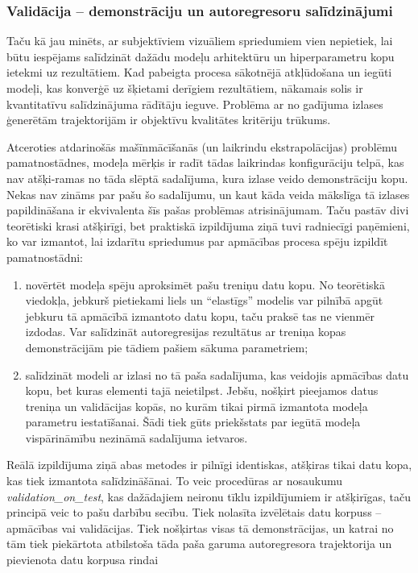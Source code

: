 \documentclass[12pt, a4paper]{article}
\numberwithin{equation}{section} %
\begin{document}
\subsubsection{Validācija -- demonstrāciju un autoregresoru salīdzinājumi}

Taču kā jau minēts, ar subjektīviem vizuāliem spriedumiem vien nepietiek, lai būtu iespējams salīdzināt dažādu modeļu arhitektūru un hiperparametru kopu ietekmi uz rezultātiem. Kad pabeigta procesa sākotnējā atkļūdošana un iegūti modeļi, kas konverģē uz šķietami derīgiem rezultātiem, nākamais solis ir kvantitatīvu salīdzinājuma rādītāju ieguve. Problēma ar no gadījuma izlases ģenerētām trajektorijām ir objektīvu kvalitātes kritēriju trūkums. 

Atceroties atdarinošās mašīnmācīšanās (un laikrindu ekstrapolācijas) problēmu pamatnostādnes, modeļa mērķis ir radīt tādas laikrindas konfigurāciju telpā, kas nav atšķi-ramas no tāda slēptā sadalījuma, kura izlase veido demonstrāciju kopu. Nekas nav zināms par pašu šo sadalījumu, un kaut kāda veida mākslīga tā izlases papildināšana ir ekvivalenta šīs pašas problēmas atrisinājumam. Taču pastāv divi teorētiski krasi atšķirīgi, bet praktiskā izpildījuma ziņā tuvi radniecīgi paņēmieni, ko var izmantot, lai izdarītu spriedumus par apmācības procesa spēju izpildīt pamatnostādni:

\begin{enumerate}
    \item novērtēt modeļa spēju aproksimēt pašu treniņu datu kopu. No teorētiskā viedokļa, jebkurš pietiekami liels un ``elastīgs'' modelis var pilnībā apgūt jebkuru tā apmācībā izmantoto datu kopu, taču praksē tas ne vienmēr izdodas. Var salīdzināt autoregresijas rezultātus ar treniņa kopas demonstrācijām pie tādiem pašiem sākuma parametriem;
    \item salīdzināt modeli ar izlasi no tā paša sadalījuma, kas veidojis apmācības datu kopu, bet kuras elementi tajā neietilpst. Jebšu, nošķirt pieejamos datus treniņa un validācijas kopās, no kurām tikai pirmā izmantota modeļa parametru iestatīšanai. Šādi tiek gūts priekšstats par iegūtā modeļa vispārināmību nezināmā sadalījuma ietvaros.
\end{enumerate}

Reālā izpildījuma ziņā abas metodes ir pilnīgi identiskas, atšķiras tikai datu kopa, kas tiek izmantota salīdzināšānai. To veic procedūras ar nosaukumu \textit{validation\_on\_test}, kas dažādajiem neironu tīklu izpildījumiem ir atšķirīgas, taču principā veic to pašu darbību secību. Tiek nolasīta izvēlētais datu korpuss -- apmācības vai validācijas. Tiek nošķirtas visas tā demonstrācijas, un katrai no tām tiek piekārtota atbilstoša tāda paša garuma autoregresora trajektorija un pievienota datu korpusa rindai
\end{document}
